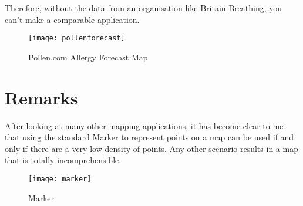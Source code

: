 Therefore, without the data from an organisation like Britain Breathing, you can't make a comparable application.

\begin{figure}[H]
\begin{center}
\texttt{[image: pollenforecast]}
\caption{Pollen.com Allergy Forecast Map}
\end{center}
\end{figure}

\section{Remarks}

After looking at many other mapping applications, it has become clear to me that using the standard Marker to represent points on a map can be used if and only if there are a very low density of points. Any other scenario results in a map that is totally incomprehensible.

\begin{figure}[H]
\centering
\texttt{[image: marker]}
\caption{Marker}\label{fig:marker}
\end{figure}